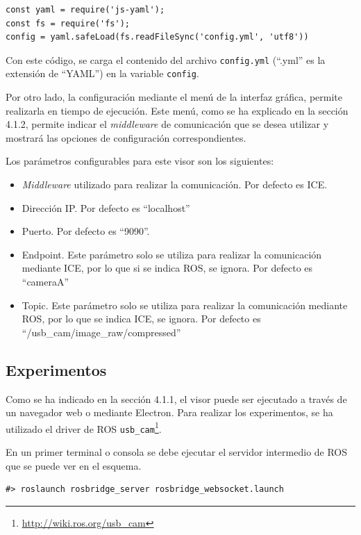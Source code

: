 \begin{lstlisting}[caption = Leer el fichero ``YAML'' con la configuración y guardar la información en una variable, label = cod.yaml]
const yaml = require('js-yaml');
const fs = require('fs');
config = yaml.safeLoad(fs.readFileSync('config.yml', 'utf8'))
\end{lstlisting}

Con este código, se carga el contenido del archivo \texttt{config.yml} (``.yml'' es la extensión de ``YAML'') en la variable \texttt{config}.

Por otro lado, la configuración mediante el menú de la interfaz gráfica, permite realizarla en tiempo de ejecución. Este menú, como se ha explicado en la sección 4.1.2, permite indicar el \textit{middleware} de comunicación que se desea utilizar y mostrará las opciones de configuración correspondientes.

Los parámetros configurables para este visor son los siguientes:
\begin{itemize}
\item \textit{Middleware} utilizado para realizar la comunicación. Por defecto es ICE.
\item Dirección IP. Por defecto es ``localhost''
\item Puerto. Por defecto es ``9090''.
\item Endpoint. Este parámetro solo se utiliza para realizar la comunicación mediante ICE, por lo que si se indica ROS, se ignora. Por defecto es ``cameraA''
\item Topic. Este parámetro solo se utiliza para realizar la comunicación mediante ROS, por lo que se indica ICE, se ignora. Por defecto es ``/usb\_cam/image\_raw/compressed''
\end{itemize}

\subsection{Experimentos}
Como se ha indicado en la sección 4.1.1, el visor puede ser ejecutado a través de un navegador web o mediante Electron. Para realizar los experimentos, se ha utilizado el driver de ROS \texttt{usb\_cam}\footnote{\url{http://wiki.ros.org/usb_cam}}.

En un primer terminal o consola se debe ejecutar el servidor intermedio de ROS que se puede ver en el esquema.

\begin{lstlisting}[caption= Ejecución del servidor intermedio, label=cod.servidorintermediocamviz]
#> roslaunch rosbridge_server rosbridge_websocket.launch
\end{lstlisting}

